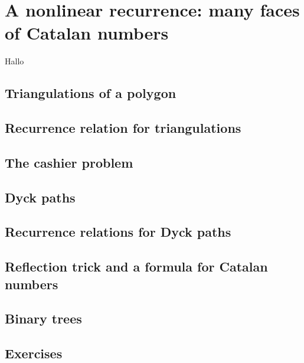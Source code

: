 \section{A nonlinear recurrence: many faces of Catalan numbers}\label{catalan} 

Hallo

\subsection{Triangulations of a polygon}

\subsection{Recurrence relation for triangulations}

\subsection{The cashier problem}

\subsection{Dyck paths}

\subsection{Recurrence relations for Dyck paths}

\subsection{Reflection trick and a formula for Catalan numbers}

\subsection{Binary trees}

\subsection{Exercises}